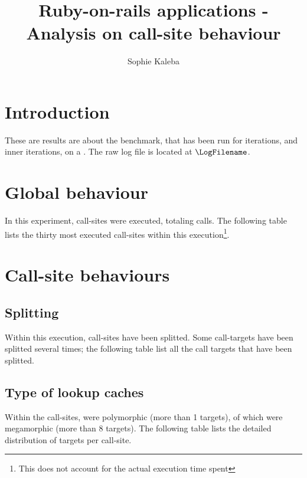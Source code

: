 \documentclass[preprint]{acmart}
\begin{document}
\title{Ruby-on-rails applications - Analysis on call-site behaviour}

\author{Sophie Kaleba}

\maketitle

\section{Introduction}

These are results are about the \BenchmarkName benchmark, that has been run for \NumIterations iterations, and \NumInnerIterations inner iterations, on a \Hihaho.
The raw log file is located at $\LogFilename$. 

\section{Global behaviour}

In this experiment, \NumberCallSites call-sites were executed, totaling \NumberCalls calls.  
The following table lists the thirty most executed call-sites within this execution\footnote{This does not account for the actual execution time spent}.

\MostExecutedCallSite

\section{Call-site behaviours}

\subsection{Splitting}

Within this execution, \NumOfSplittedTargets call-sites have been splitted.
Some call-targets have been splitted several times; the following table list all the call targets that have been splitted.

\MoreThanOneSplit

\subsection{Type of lookup caches}

Within the \NumberCallSites call-sites, \NumberPolymorphic were polymorphic (more than 1 targets), of which \NumberMegamorphic were megamorphic (more than 8 targets).
The following table lists the detailed distribution of targets per call-site.
\end{document}
